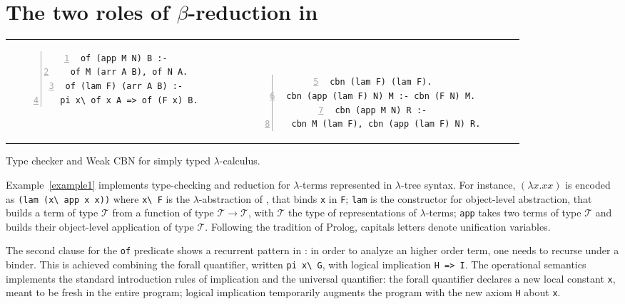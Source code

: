\documentclass{llncs}
\begin{document}

\section{The two roles of $\beta$-reduction in \lp{}}
\label{sec:beta}

\begin{example}[b]
\begin{center}
\begin{tabular}{cc}
\begin{minipage}{4.8cm}
\begin{Verbatim}[numbers=left,numbersep=1pt,frame=leftline]
of (app M N) B :-
  of M (arr A B), of N A.
of (lam F) (arr A B) :-
  pi x\ of x A => of (F x) B.
\end{Verbatim}
\end{minipage}~~
&
~~~\begin{minipage}{6.5cm}
\begin{Verbatim}[numbers=left,firstnumber=5,numbersep=1pt,frame=leftline]
cbn (lam F) (lam F).
cbn (app (lam F) N) M :- cbn (F N) M.
cbn (app M N) R :-
  cbn M (lam F), cbn (app (lam F) N) R.
\end{Verbatim}
\end{minipage}
\end{tabular}
\end{center}
\caption{\label{example1} Type checker and Weak CBN for simply typed $\lambda$-calculus.}
\end{example}

Example~\ref{example1} implements type-checking and
reduction for $\lambda$-terms represented in $\lambda$-tree syntax.
For instance,
$(\lambda x.xx)$ is encoded
as \verb+(lam (x\ app x x))+ where \verb+x\ F+ is
the $\lambda$-abstraction of \lp{}, that binds \verb+x+ in \verb+F+;
\verb+lam+ is the constructor for object-level abstraction, that builds
a term of type $\mathcal{T}$ from a function of type
$\mathcal{T} \to \mathcal{T}$, with $\mathcal{T}$ the type of representations
of $\lambda$-terms; \verb+app+ takes two terms of type $\mathcal{T}$ and builds
their object-level application of type $\mathcal{T}$. Following the tradition of Prolog, capitals letters denote unification variables.

The second clause for the \verb+of+ predicate shows a recurrent pattern in
\lp: in order to analyze an higher order term, one needs to recurse
under a binder. This is achieved
combining the forall quantifier, written \verb+pi x\ G+, with logical
implication \verb+H => I+. The operational semantics implements the
standard introduction rules of implication and the universal quantifier:
the forall quantifier declares a
new local constant \verb+x+, meant to be fresh in the entire program;
logical implication temporarily
augments the program with the new axiom \verb+H+ about \verb+x+.
\end{document}
